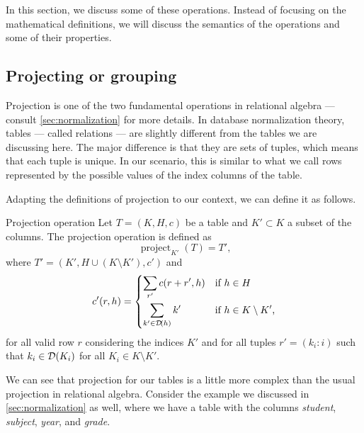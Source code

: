 In this section, we discuss some of these operations.  Instead of focusing on the
mathematical definitions, we will discuss the semantics of the operations and some
of their properties.

\subsection{Projecting or grouping}
\label{sub:projection}

Projection is one of the two fundamental operations in relational algebra --- consult
\cref{sec:normalization} for more details.  In database normalization theory, tables ---
called relations --- are slightly different from the tables we are discussing here. The
major difference is that they are sets of tuples, which means that each tuple is unique.
In our scenario, this is similar to what we call rows represented by the possible values
of the index columns of the table.

Adapting the definitions of projection to our context, we can define it as follows.

\begin{definition}{Projection operation}\label{def:projection}
  Let $T = (K, H, c)$ be a table and $K' \subset K$ a subset of the columns.  The
  projection operation is defined as \[
    \operatorname{project}_{K'}(T) = T'\text{,}
  \] where $T' = (K', H \cup (K \setminus K'), c')$ and \[
    c'(r, h) = \begin{dcases}
      \sum_{r'} c(r + r', h) & \text{if } h \in H \\
      \sum_{k' \in \mathcal{D}\!\left(h\right)} k' & \text{if } h \in K \setminus K'\text{,}
    \end{dcases}
  \] for all valid row $r$ considering the indices $K'$ and for all tuples $r' = (k_i :
  i)$ such that $k_i \in \mathcal{D}\!\left(K_i\right)$ for all $K_i \in K \setminus K'$.
\end{definition}

We can see that projection for our tables is a little more complex than the usual
projection in relational algebra.  Consider the example we discussed in
\cref{sec:normalization} as well, where we have a table with the columns \emph{student},
\emph{subject}, \emph{year}, and \emph{grade}.

